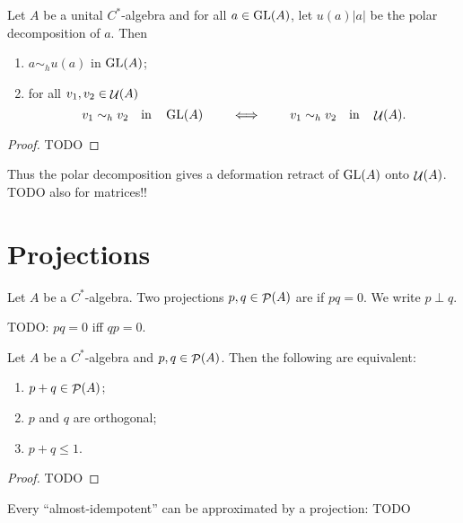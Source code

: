 \begin{proposition} \label{prop:unitariesRetractionOfGL}
Let $A$ be a unital $C^*$-algebra and for all $a\in\operatorname{GL}(A)$, let $u(a)|a|$ be the polar decomposition of $a$. Then
\begin{enumerate}
\item $a\sim_h u(a)$ in $\operatorname{GL}(A)$;
\item for all $v_1,v_2\in\mathop{\mathcal{U}}\nolimits(A)$
\[ v_1\sim_h v_2 \quad \text{in}\quad \operatorname{GL}(A) \qquad \iff \qquad v_1\sim_h v_2 \quad \text{in}\quad \mathop{\mathcal{U}}\nolimits(A). \]
\end{enumerate}
\end{proposition}
\begin{proof}
TODO
\end{proof}
Thus the polar decomposition gives a deformation retract of $\operatorname{GL}(A)$ onto $\mathop{\mathcal{U}}\nolimits(A)$.
TODO also for matrices!!


\section{Projections}
\begin{definition}
Let $A$ be a $C^*$-algebra. Two projections $p,q\in\mathop{\mathcal{P}}\nolimits(A)$ are  if $pq = 0$. We write $p \perp q$.
\end{definition}
TODO: $pq = 0$ iff $qp = 0$.

\begin{lemma}
Let $A$ be a $C^*$-algebra and $p,q\in\mathop{\mathcal{P}}\nolimits(A)$. Then the following are equivalent:
\begin{enumerate}
\item $p+q \in \mathop{\mathcal{P}}\nolimits(A)$;
\item $p$ and $q$ are orthogonal;
\item $p+q \leq 1$.
\end{enumerate}
\end{lemma}
\begin{proof}
TODO
\end{proof}
Every ``almost-idempotent'' can be approximated by a projection:
TODO

